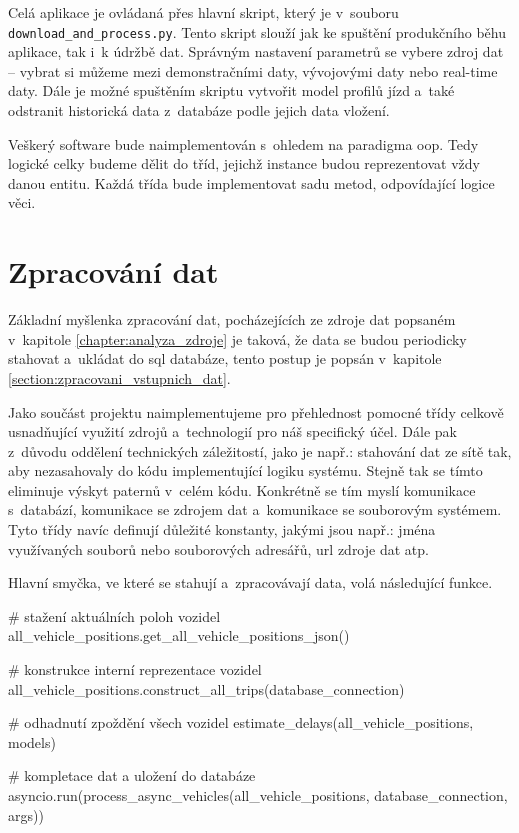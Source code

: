 \bigbreak


Celá aplikace je ovládaná přes hlavní skript, který je v~souboru \texttt{download\_and\allowbreak\_process.py}. Tento skript slouží jak ke spuštění produkčního běhu aplikace, tak i~k údržbě dat. Správným nastavení parametrů se vybere zdroj dat -- vybrat si můžeme mezi demonstračními daty, vývojovými daty nebo real-time daty. Dále je možné spuštěním skriptu vytvořit model profilů jízd a~také odstranit historická data z~databáze podle jejich data vložení.


\bigbreak


Veškerý software bude naimplementován s~ohledem na paradigma \gls{oop}. Tedy logické celky budeme dělit do tříd, jejichž instance budou reprezentovat vždy danou entitu. Každá třída bude implementovat sadu metod, odpovídající logice věci.


\section{Zpracování dat} \label{section:zpracovani_dat}


Základní myšlenka zpracování dat, pocházejících ze zdroje dat popsaném v~kapitole \ref{chapter:analyza_zdroje} je taková, že data se budou periodicky stahovat a~ukládat do \gls{sql} databáze, tento postup je popsán v~kapitole \ref{section:zpracovani_vstupnich_dat}.


\bigbreak

Jako součást projektu naimplementujeme pro přehlednost pomocné třídy celkově usnadňující využití zdrojů a~technologií pro náš specifický účel. Dále pak z~důvodu oddělení technických záležitostí, jako je např.: stahování dat ze sítě tak, aby nezasahovaly do kódu implementující logiku systému. Stejně tak se tímto eliminuje výskyt paternů v~celém kódu. Konkrétně se tím myslí komunikace s~databází, komunikace se zdrojem dat a~komunikace se souborovým systémem. Tyto třídy navíc definují důležité konstanty, jakými jsou např.: jména využívaných souborů nebo souborových adresářů, \gls{url} zdroje dat atp.


\bigbreak


Hlavní smyčka, ve které se stahují a~zpracovávají data, volá následující funkce.


\begin{code}[frame=none]
# stažení aktuálních poloh vozidel
all_vehicle_positions.get_all_vehicle_positions_json()

# konstrukce interní reprezentace vozidel
all_vehicle_positions.construct_all_trips(database_connection)

# odhadnutí zpoždění všech vozidel
estimate_delays(all_vehicle_positions, models)

# kompletace dat a uložení do databáze
asyncio.run(process_async_vehicles(all_vehicle_positions,
database_connection, args))
\end{code}



